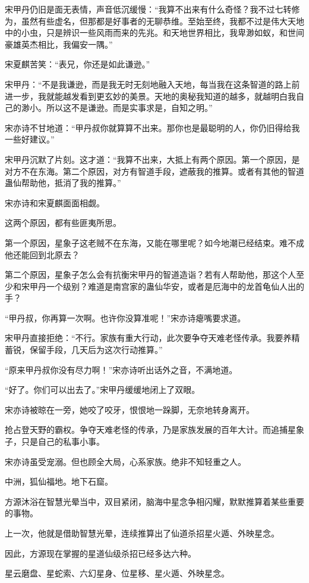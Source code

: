 \begin{this_body}
宋甲丹仍旧是面无表情，声音低沉缓慢：“我算不出来有什么奇怪？我不过七转修为，虽然有些虚名，但那都是好事者的无聊恭维。至始至终，我都不过是伟大天地中的小虫，只是辨识一些风雨而来的先兆。和天地世界相比，我卑渺如蚁，和世间豪雄英杰相比，我偏安一隅。”

宋夏麒苦笑：“表兄，你还是如此谦逊。”

宋甲丹：“不是我谦逊，而是我无时无刻地融入天地，每当我在这条智道的路上前进一步，我就能越发看到更玄妙的美景。天地的奥秘我知道的越多，就越明白我自己的渺小。所以这不是谦逊。而是实事求是，自知之明。”

宋亦诗不甘地道：“甲丹叔你就算算不出来。那你也是最聪明的人，你仍旧得给我一些好建议。”

宋甲丹沉默了片刻。这才道：“我算不出来，大抵上有两个原因。第一个原因，是对方不在东海。第二个原因，对方有智道手段，遮蔽我的推算。或者有其他的智道蛊仙帮助他，抵消了我的推算。”

宋亦诗和宋夏麒面面相觑。

这两个原因，都有些匪夷所思。

第一个原因，星象子这老贼不在东海，又能在哪里呢？如今地潮已经结束。难不成他还能回到北原去？

第二个原因，星象子怎么会有抗衡宋甲丹的智道造诣？若有人帮助他，那这个人至少和宋甲丹一个级别？难道是南宫家的蛊仙华安，或者是厄海中的龙首龟仙人出的手？

“甲丹叔，你再算一次啊。也许你没算准呢！”宋亦诗瘪嘴要求道。

宋甲丹直接拒绝：“不行。家族有重大行动，此次要争夺天难老怪传承。我要养精蓄锐，保留手段，几天后为这次行动推算。”

“原来甲丹叔你没有尽力啊！”宋亦诗听出话外之音，不满地道。

“好了。你们可以出去了。”宋甲丹缓缓地闭上了双眼。

宋亦诗被晾在一旁，她咬了咬牙，恨恨地一跺脚，无奈地转身离开。

抢占登天野的霸权。争夺天难老怪的传承，乃是家族发展的百年大计。而追捕星象子，只是自己的私事小事。

宋亦诗虽受宠溺。但也顾全大局，心系家族。绝非不知轻重之人。

中洲，狐仙福地。地下石窟。

方源沐浴在智慧光晕当中，双目紧闭，脑海中星念争相闪耀，默默推算着某些重要的事物。

上一次，他就是借助智慧光晕，连续推算出了仙道杀招星火遁、外映星念。

因此，方源现在掌握的星道仙级杀招已经多达六种。

星云磨盘、星蛇索、六幻星身、位星移、星火遁、外映星念。


\end{this_body}

